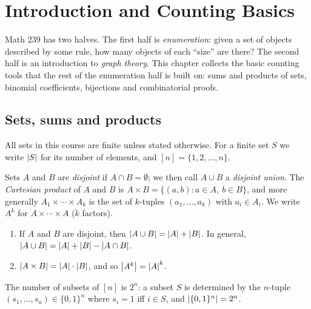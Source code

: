\chapter{Introduction and Counting Basics}

Math 239 has two halves. The first half is \emph{enumeration}: given a set of objects
described by some rule, how many objects of each ``size'' are there? The second half is an
introduction to \emph{graph theory}. This chapter collects the basic counting tools that the
rest of the enumeration half is built on: sums and products of sets, binomial coefficients,
bijections and combinatorial proofs.

\section{Sets, sums and products}

All sets in this course are finite unless stated otherwise. For a finite set $S$ we write
$\left\lvert S \right\rvert$ for its number of elements, and $[n] = \{1, 2, \dots, n\}$.

\begin{definition}
Sets $A$ and $B$ are \emph{disjoint} if $A \cap B = \emptyset$; we then call $A \cup B$ a
\emph{disjoint union}. The \emph{Cartesian product} of $A$ and $B$ is
$A \times B = \{(a,b) : a \in A,\ b \in B\}$, and more generally
$A_1 \times \cdots \times A_k$ is the set of $k$-tuples $(a_1,\dots,a_k)$ with $a_i \in A_i$.
We write $A^k$ for $A \times \cdots \times A$ ($k$ factors).
\end{definition}

\begin{theorem}
\begin{enumerate}
  \item If $A$ and $B$ are disjoint, then $\left\lvert A \cup B \right\rvert = \left\lvert A \right\rvert + \left\lvert B \right\rvert$. In general,
        $\left\lvert A\cup B \right\rvert = \left\lvert A \right\rvert + \left\lvert B \right\rvert - \left\lvert A \cap B \right\rvert$.
  \item $\left\lvert A \times B \right\rvert = \left\lvert A \right\rvert\cdot\left\lvert B \right\rvert$, and so $\left\lvert A^k \right\rvert = \left\lvert A \right\rvert^k$.
\end{enumerate}
\end{theorem}

\begin{example}
The number of subsets of $[n]$ is $2^n$: a subset $S$ is determined by the $n$-tuple
$(s_1,\dots,s_n) \in \{0,1\}^n$ where $s_i = 1$ iff $i \in S$, and $\left\lvert \{0,1\}^n \right\rvert = 2^n$.
\end{example}

